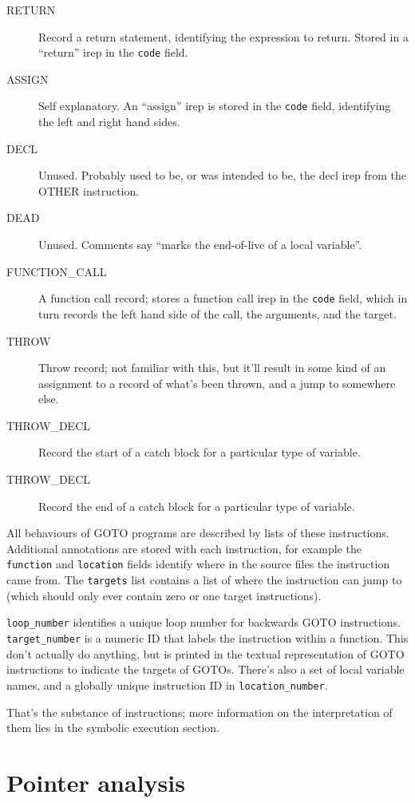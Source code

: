 \documentclass{article}
\begin{document}
\begin{description}
\item[RETURN] Record a return statement, identifying the expression to return.
Stored in a ``return'' irep in the \texttt{code} field.
\item[ASSIGN] Self explanatory. An ``assign'' irep is stored in the
\texttt{code} field, identifying the left and right hand sides.
\item[DECL] Unused. Probably used to be, or was intended to be, the decl
irep from the OTHER instruction.
\item[DEAD] Unused. Comments say ``marks the end-of-live of a local variable''.
\item[FUNCTION\_CALL] A function call record; stores a function call irep in
the \texttt{code} field, which in turn records the left hand side of the call,
the arguments, and the target.
\item[THROW] Throw record; not familiar with this, but it'll result in some
kind of an assignment to a record of what's been thrown, and a jump to somewhere
else.
\item[THROW\_DECL] Record the start of a catch block for a particular type
of variable.
\item[THROW\_DECL] Record the end of a catch block for a particular type
of variable.
\end{description}

All behaviours of GOTO programs are described by lists of these instructions.
Additional annotations are stored with each instruction, for example the
\texttt{function} and \texttt{location} fields identify where in the source
files the instruction came from. The \texttt{targets} list contains a list
of where the instruction can jump to (which should only ever contain zero or
one target instructions).

\texttt{loop\_number} identifies a unique loop number for backwards
GOTO instructions. \texttt{target\_number} is a numeric ID that labels
the instruction within a function. This don't actually do anything, but
is printed in the textual representation of GOTO instructions to indicate
the targets of GOTOs.  There's also a set of local variable names, and
a globally unique instruction ID in \texttt{location\_number}.

That's the substance of instructions; more information on the interpretation
of them lies in the symbolic execution section.

\section{Pointer analysis}
\end{document}
